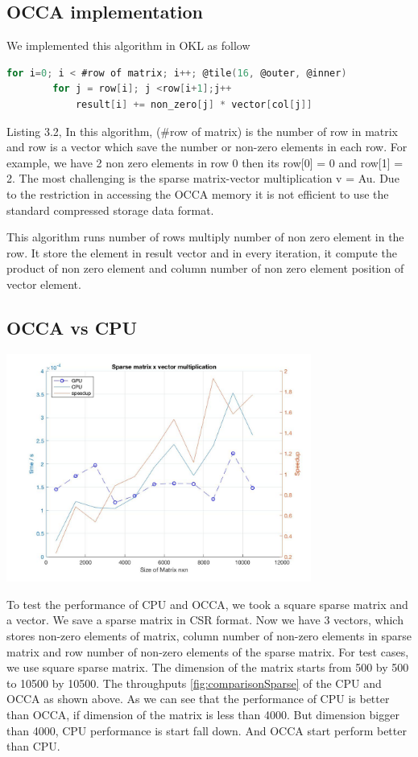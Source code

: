 \subsection{OCCA implementation}
We implemented this algorithm in OKL as follow\\
\begin{lstlisting}[language=C, caption=matrix vector multiplication in OCCA]
	for i=0; i < #row of matrix; i++; @tile(16, @outer, @inner)
		for j = row[i]; j <row[i+1];j++
			result[i] += non_zero[j] * vector[col[j]]
\end{lstlisting}
Listing 3.2, In this algorithm, (\#row of matrix) is the number of row in matrix and row is a vector which save the number or non-zero elements in each row. For example, we have 2 non zero elements in row 0 then its row[0] = 0 and row[1] = 2.
The most challenging is the sparse matrix-vector multiplication v = Au. Due to the  restriction in accessing the OCCA memory it is not efficient to use the standard compressed storage data format.

This algorithm runs number of rows multiply number of non zero element in the row. It store the element in result vector and in every iteration, it compute the product of non zero element and column number of non zero element position of vector element.

\subsection{OCCA vs CPU}
\begin{center}
	\includegraphics[width = 10cm]{Chapters/sparse_matrix_vector.jpg}
	\label{fig:comparisonSparse}
\end{center}
To test the performance of CPU and OCCA, we took a square sparse matrix and a vector. We save a sparse matrix in CSR format. Now we have 3 vectors, which stores non-zero elements of matrix, column number of non-zero elements in sparse matrix and row number of non-zero elements of the sparse matrix. For test cases, we use square sparse matrix. The dimension of the matrix starts from 500 by 500 to  10500 by 10500. The throughputs \ref{fig:comparisonSparse} of the CPU and OCCA as shown above. As we can see that the performance of CPU is better than OCCA, if dimension of the matrix is less than 4000. But dimension bigger than 4000, CPU performance is start fall down. And OCCA start perform better than CPU.


